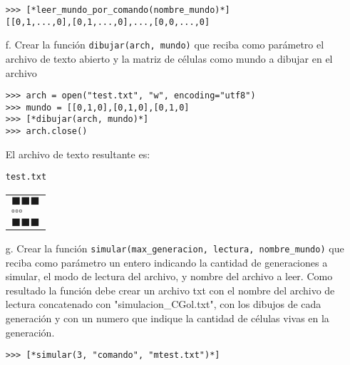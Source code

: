 \begin{itemize}
\begin{lstlisting}[style=consola]
>>> [*leer_mundo_por_comando(nombre_mundo)*]
[[0,1,...,0],[0,1,...,0],...,[0,0,...,0]
\end{lstlisting}

\item[f.] Crear la función \texttt{dibujar(arch, mundo)} que reciba como parámetro el archivo de texto abierto y la matriz de células como mundo a dibujar en el archivo

\begin{lstlisting}[style=consola]
>>> arch = open("test.txt", "w", encoding="utf8")
>>> mundo = [[0,1,0],[0,1,0],[0,1,0]
>>> [*dibujar(arch, mundo)*]
>>> arch.close()
\end{lstlisting}

El archivo de texto resultante es:

\begin{center}
    \texttt{test.txt} \\
	\begin{tabular}{|l|}
		\hline
        $\blacksquare \blacksquare \blacksquare$\\
        $\square \square \square$\\
        $\blacksquare \blacksquare \blacksquare$\\
		\hline
	\end{tabular}
\end{center}

\item[g.] Crear la función \texttt{simular(max\_generacion, lectura, nombre\_mundo)} que reciba como parámetro un entero indicando la cantidad de generaciones a simular, el modo de lectura del archivo, y nombre del archivo a leer. Como resultado la función debe crear un archivo txt con el nombre del archivo de lectura concatenado con "simulacion\_CGol.txt", con los dibujos de cada generación y con un numero que indique la cantidad de células vivas en la generación.

\begin{lstlisting}[style=consola]
>>> [*simular(3, "comando", "mtest.txt")*]
\end{lstlisting}
\end{itemize}

